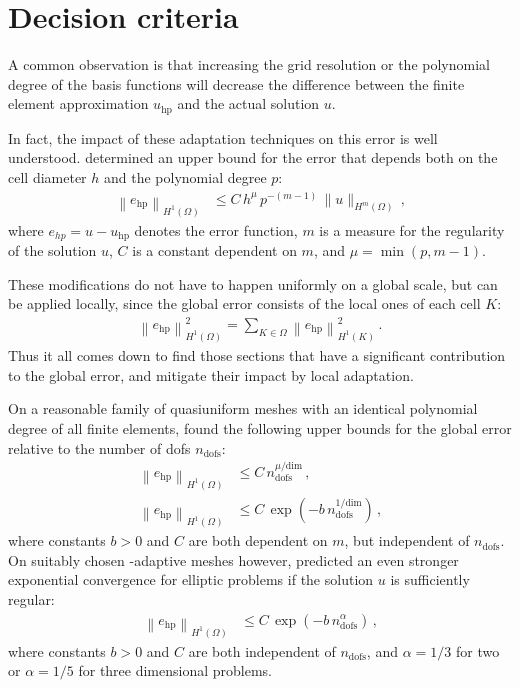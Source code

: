 \section{Decision criteria}
\label{sec:decision}

A common observation is that increasing the grid resolution or the polynomial degree of the basis functions will decrease the difference between the finite element approximation $u_\text{hp}$ and the actual solution $u$.

In fact, the impact of these adaptation techniques on this error is well understood. \textcite[Thm.~3.4]{babuska1990} determined an upper bound for the error that depends both on the cell diameter $h$ and the polynomial degree $p$:
\begin{align}
\label{eq:errorbound_hp} \left\|e_\text{hp}\right\|_{H^{1}(\Omega)} &\leq C \, h^{\mu} \, p^{-(m-1)} \, \|u\|_{H^{m}(\Omega)} \,\text{,}
\end{align}
where $e_{hp} = u - u_\text{hp}$ denotes the error function, $m$ is a measure for the regularity of the solution $u$, $C$ is a constant dependent on $m$, and $\mu = \min \left(p, m - 1\right)$.

These modifications do not have to happen uniformly on a global scale, but can be applied locally, since the global error consists of the local ones of each cell $K$:
\begin{align}
\label{eq:error_sum} \left\|e_\text{hp}\right\|_{H^1(\Omega)}^2 = \sum\limits_{K \in \Omega} \left\|e_\text{hp}\right\|_{H^1(K)}^2 \,\text{.}
\end{align}
Thus it all comes down to find those sections that have a significant contribution to the global error, and mitigate their impact by local adaptation.

On a reasonable family of quasiuniform meshes with an identical polynomial degree of all finite elements, \textcite{babuska1996} found the following upper bounds for the global error relative to the number of \glspl{dof} $n_\text{dofs}$:
\begin{align}
\label{eq:errorbound_ana} \left\|e_\text{hp}\right\|_{H^{1}(\Omega)} &\leq C \, n_\text{dofs}^{\mu/\text{dim}} \,\text{,} \\
\left\|e_\text{hp}\right\|_{H^{1}(\Omega)} &\leq C \, \exp\left(- b \, n_\text{dofs}^{1/\text{dim}} \right) \,\text{,}
\end{align}
where constants $b > 0$ and $C$ are both dependent on $m$, but independent of $n_\text{dofs}$. On suitably chosen \hp-adaptive meshes however, \textcites[Thm.~5.1]{guo1986}[Thm.~2.5.2, Thm.~3.5.1]{babuska1996} predicted an even stronger exponential convergence for elliptic problems if the solution $u$ is sufficiently regular:
\begin{align}
\label{eq:errorbound_exp} \left\|e_\text{hp}\right\|_{H^{1}(\Omega)} &\leq C \, \exp\left(- b \, n_\text{dofs}^\alpha \right) \,\text{,}
\end{align}
where constants $b > 0$ and $C$ are both independent of $n_\text{dofs}$, and $\alpha = 1/3$ for two or $\alpha = 1/5$ for three dimensional problems.

